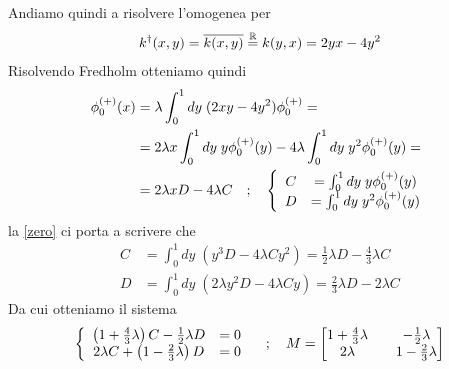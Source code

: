 \begin{enumerate}
	Andiamo quindi a risolvere l'omogenea per
	\begin{align}
		k^\dagger (x,y) = \overline{k(x,y)} \overset{\mathbb{R}}{=} k(y,x) = 2yx - 4y^2
	\end{align} 
	Risolvendo Fredholm otteniamo quindi
	\begin{align}
		\phi_0^{(+)}(x) &= \lambda \int_{0}^{1} dy \; (2xy-4y^2) \phi_0^{(+)} = \nonumber\\
		&=  2\lambda x\int_{0}^{1} dy \; y \phi_0^{(+)}(y) -4\lambda \int_{0}^{1} dy \;y^2 \phi_0^{(+)}(y) = \nonumber\\
		&= 2\lambda x D - 4 \lambda C \quad ; \quad \left\{ \begin{array}{cc} C &= \int_{0}^{1} dy \; y \phi_0^{(+)}(y)\\ D &= \int_{0}^{1} dy \;y^2 \phi_0^{(+)}(y) \end{array} \right. \label{zero}
	\end{align}
	la \ref{zero} ci porta a scrivere che
	\begin{align}
		C &= \int_{0}^{1} dy \; \left( y^3D - 4\lambda C y^2 \right) = \frac{1}{2} \lambda D - \frac{4}{3} \lambda C\\
		D &= \int_{0}^{1} dy \; \left( 2\lambda y^2D - 4\lambda C y \right) = \frac{2}{3} \lambda D - 2 \lambda C
	\end{align}
	Da cui otteniamo il sistema
	\begin{align}
		\left\{ \begin{array}{cc} \left(1 + \frac{4}{3} \lambda\right) C - \frac{1}{2} \lambda D &= 0\\ 2\lambda C + \left( 1 - \frac{2}{3}\lambda \right) D &=0 \end{array} \right. \quad ; \quad M = \begin{bmatrix}
			1 + \frac{4}{3} \lambda && - \frac{1}{2} \lambda\\
			2 \lambda && 1- \frac{2}{3} \lambda
		\end{bmatrix}
	\end{align}


\end{enumerate}
